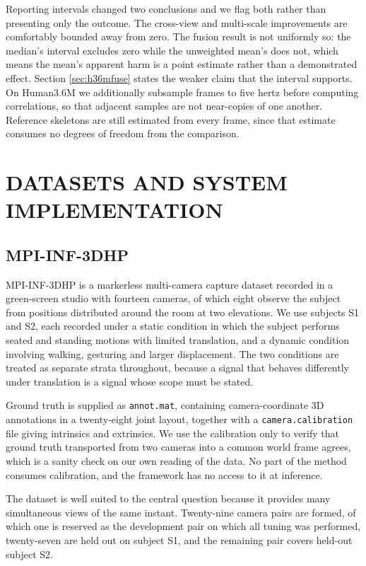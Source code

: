 \documentclass[12pt,a4paper]{report}
\begin{document}
 Reporting intervals changed two conclusions and we flag both rather than presenting only the outcome. The cross-view and multi-scale improvements are comfortably bounded away from zero. The fusion result is not uniformly so: the median's interval excludes zero while the unweighted mean's does not, which means the mean's apparent harm is a point estimate rather than a demonstrated effect. Section \ref{sec:h36mfuse} states the weaker claim that the interval supports. On Human3.6M we additionally subsample frames to five hertz before computing correlations, so that adjacent samples are not near-copies of one another. Reference skeletons are still estimated from every frame, since that estimate consumes no degrees of freedom from the comparison.

\chapter{DATASETS AND SYSTEM IMPLEMENTATION}

\section{MPI-INF-3DHP}

MPI-INF-3DHP is a markerless multi-camera capture dataset recorded in a green-screen studio with fourteen cameras, of which eight observe the subject from positions distributed around the room at two elevations. We use subjects S1 and S2, each recorded under a static condition in which the subject performs seated and standing motions with limited translation, and a dynamic condition involving walking, gesturing and larger displacement. The two conditions are treated as separate strata throughout, because a signal that behaves differently under translation is a signal whose scope must be stated.

Ground truth is supplied as \texttt{annot.mat}, containing camera-coordinate 3D annotations in a twenty-eight joint layout, together with a \texttt{camera.calibration} file giving intrinsics and extrinsics. We use the calibration only to verify that ground truth transported from two cameras into a common world frame agrees, which is a sanity check on our own reading of the data. No part of the method consumes calibration, and the framework has no access to it at inference.

The dataset is well suited to the central question because it provides many simultaneous views of the same instant. Twenty-nine camera pairs are formed, of which one is reserved as the development pair on which all tuning was performed, twenty-seven are held out on subject S1, and the remaining pair covers held-out subject S2.
\end{document}
